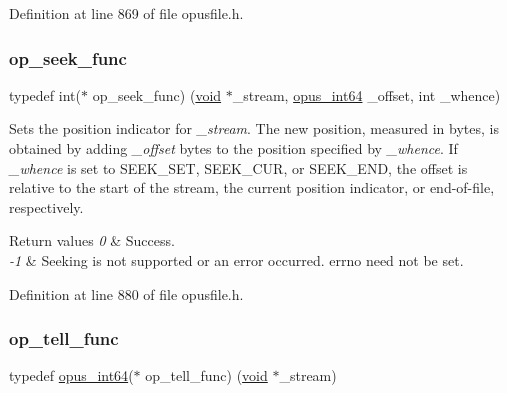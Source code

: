 Definition at line 869 of file opusfile.\+h.

\mbox{\label{group__stream__callbacks_gae57cb396d1f193d3f4e7e56ddad7760e}} 
\subsubsection{\texorpdfstring{op\_seek\_func}{op\_seek\_func}}
{\footnotesize\ttfamily typedef int($\ast$ op\+\_\+seek\+\_\+func) (\mbox{\hyperlink{_s_d_l__opengles2__gl2ext_8h_ae5d8fa23ad07c48bb609509eae494c95}{void}} $\ast$\+\_\+stream, \mbox{\hyperlink{opus__types_8h_ab6742070cf9d0ccffca2b80522b4f41a}{opus\+\_\+int64}} \+\_\+offset, int \+\_\+whence)}

Sets the position indicator for {\itshape \+\_\+stream}. The new position, measured in bytes, is obtained by adding {\itshape \+\_\+offset} bytes to the position specified by {\itshape \+\_\+whence}. If {\itshape \+\_\+whence} is set to {\ttfamily S\+E\+E\+K\+\_\+\+S\+ET}, {\ttfamily S\+E\+E\+K\+\_\+\+C\+UR}, or {\ttfamily S\+E\+E\+K\+\_\+\+E\+ND}, the offset is relative to the start of the stream, the current position indicator, or end-\/of-\/file, respectively. 
\begin{DoxyRetVals}{Return values}
{\em 0} & Success. \\
\hline
{\em -\/1} & Seeking is not supported or an error occurred. {\ttfamily errno} need not be set. \\
\hline
\end{DoxyRetVals}


Definition at line 880 of file opusfile.\+h.

\mbox{\label{group__stream__callbacks_gaca012812dea4bc3a27b0c23575efecaf}} 
\subsubsection{\texorpdfstring{op\_tell\_func}{op\_tell\_func}}
{\footnotesize\ttfamily typedef \mbox{\hyperlink{opus__types_8h_ab6742070cf9d0ccffca2b80522b4f41a}{opus\+\_\+int64}}($\ast$ op\+\_\+tell\+\_\+func) (\mbox{\hyperlink{_s_d_l__opengles2__gl2ext_8h_ae5d8fa23ad07c48bb609509eae494c95}{void}} $\ast$\+\_\+stream)}


